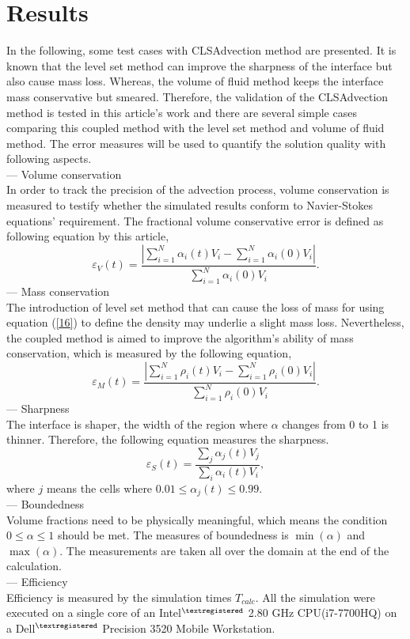 \section{Results}
In the following, some test cases with CLSAdvection method are presented. It is known that the level set method can improve the sharpness of the interface but also cause mass loss. Whereas, the volume of fluid method keeps the interface mass conservative but smeared. Therefore, the validation of the CLSAdvection method is tested in this article's work and there are several simple cases comparing this coupled method with the level set method and volume of fluid method. The error measures will be used to quantify the solution quality with following aspects.\\
--- Volume conservation\\
In order to track the precision of the advection process, volume conservation is measured to testify whether the simulated results conform to Navier-Stokes equations' requirement. The fractional volume conservative error is defined as following equation by this article\cite{gopala2008volume},
\begin{equation}\label{28}
\varepsilon_{V}(t)=\frac{\left|\sum\limits^N_{i=1}\alpha_i(t)V_i-\sum\limits^N_{i=1}\alpha_i(0)V_i\right|}{\sum\limits^N_{i=1}\alpha_{i}(0)V_i}.
\end{equation}
--- Mass conservation\\
The introduction of level set method that can cause the loss of mass for using equation (\ref{16}) to define the density may underlie a slight mass loss. Nevertheless, the coupled method is aimed to improve the algorithm's ability of mass conservation, which is measured by the following equation,
\begin{equation}\label{29}
\varepsilon_{M}(t)=\frac{\left|\sum\limits^N_{i=1}\rho_i(t)V_i-\sum\limits_{i=1}^N\rho_i(0)V_i\right|}{\sum\limits^N_{i=1}\rho_i(0)V_i}.
\end{equation}
--- Sharpness\\
The interface is shaper, the width of the region where $\alpha$ changes from 0 to 1 is thinner. Therefore, the following equation measures the sharpness.
\begin{equation}\label{30}
\varepsilon_{S}(t)=\frac{\sum_j\alpha_j(t)V_j}{\sum_i\alpha_i(t)V_i},
\end{equation}
where $j$ means the cells where $0.01\leq\alpha_j(t)\leq{0.99}$.\\
--- Boundedness\\
Volume fractions need to be physically meaningful, which means the condition $0\leq\alpha\leq{1}$ should be met. The measures of boundedness is $\min{(\alpha)}$ and $\max{(\alpha)}$. The measurements are taken all over the domain at the end of the calculation.\\ 
--- Efficiency\\
Efficiency is measured by the simulation times $T_{calc}$. All the simulation were executed on a single core of an Intel$^{\textregistered}$ 2.80 GHz CPU(i7-7700HQ) on a Dell$^{\textregistered}$ Precision 3520 Mobile Workstation.

